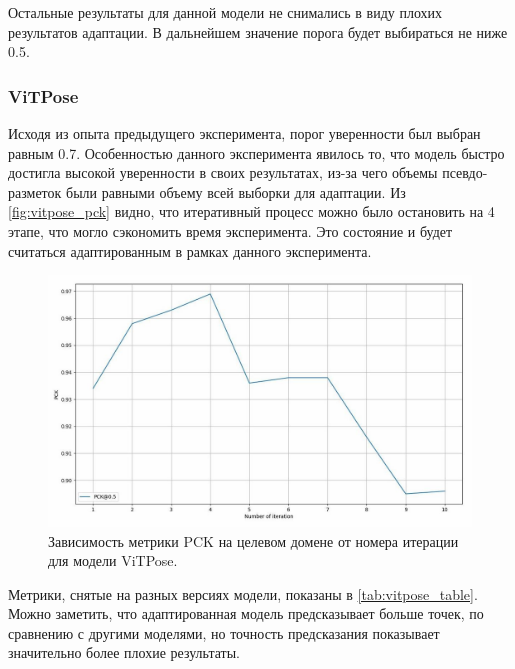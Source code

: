Остальные результаты для данной модели не снимались в виду плохих результатов адаптации. В дальнейшем значение порога будет выбираться не ниже 0.5.

\subsubsection*{ViTPose}

Исходя из опыта предыдущего эксперимента, порог уверенности был выбран равным 0.7. Особенностью данного эксперимента явилось то, что модель быстро достигла высокой уверенности в своих результатах, из-за чего объемы псевдо-разметок были равными объему всей выборки для адаптации. Из \autoref{fig:vitpose_pck} видно, что итеративный процесс можно было остановить на 4 этапе, что могло сэкономить время эксперимента. Это состояние и будет считаться адаптированным в рамках данного эксперимента.

\begin{figure}[H]
	\centering
	\includegraphics[width=\textwidth]{./images/experiment/results/vitpose/vitpose_pck}
	\caption{Зависимость метрики PCK на целевом домене от номера итерации для модели ViTPose.}
	\label{fig:vitpose_pck}
\end{figure}

Метрики, снятые на разных версиях модели, показаны в \autoref{tab:vitpose_table}. Можно заметить, что адаптированная модель предсказывает больше точек, по сравнению с другими моделями, но точность предсказания показывает значительно более плохие результаты. 

